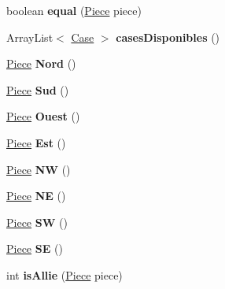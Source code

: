 \begin{DoxyCompactItemize}
\item 
boolean {\bfseries equal} (\hyperlink{class_piece}{Piece} piece)\hypertarget{class_piece_a7f9f2a3c7eda5a514b4170a354a85219}{}\label{class_piece_a7f9f2a3c7eda5a514b4170a354a85219}

\item 
Array\+List$<$ \hyperlink{class_case}{Case} $>$ {\bfseries cases\+Disponibles} ()\hypertarget{class_piece_a4023e5d15a349d33a4751de3715f8fd5}{}\label{class_piece_a4023e5d15a349d33a4751de3715f8fd5}

\item 
\hyperlink{class_piece}{Piece} {\bfseries Nord} ()\hypertarget{class_piece_a3632015f5d1331181681bb66ccd4bfb9}{}\label{class_piece_a3632015f5d1331181681bb66ccd4bfb9}

\item 
\hyperlink{class_piece}{Piece} {\bfseries Sud} ()\hypertarget{class_piece_a29bbc81f7f3590113cbc8bb0f5b93f28}{}\label{class_piece_a29bbc81f7f3590113cbc8bb0f5b93f28}

\item 
\hyperlink{class_piece}{Piece} {\bfseries Ouest} ()\hypertarget{class_piece_a214faa1a1483788ef65dc508f754be61}{}\label{class_piece_a214faa1a1483788ef65dc508f754be61}

\item 
\hyperlink{class_piece}{Piece} {\bfseries Est} ()\hypertarget{class_piece_ae70dd25fc57b4db1e2e5dee0f2771a25}{}\label{class_piece_ae70dd25fc57b4db1e2e5dee0f2771a25}

\item 
\hyperlink{class_piece}{Piece} {\bfseries NW} ()\hypertarget{class_piece_ae6ca403a299e7eac82168442dd652b28}{}\label{class_piece_ae6ca403a299e7eac82168442dd652b28}

\item 
\hyperlink{class_piece}{Piece} {\bfseries NE} ()\hypertarget{class_piece_af23d8d7f49b2da14f7c618b9966175f9}{}\label{class_piece_af23d8d7f49b2da14f7c618b9966175f9}

\item 
\hyperlink{class_piece}{Piece} {\bfseries SW} ()\hypertarget{class_piece_a6d1f8de619898cd2e29c394a4d8eecc0}{}\label{class_piece_a6d1f8de619898cd2e29c394a4d8eecc0}

\item 
\hyperlink{class_piece}{Piece} {\bfseries SE} ()\hypertarget{class_piece_af3553cdbbfa760fb29b5e83bbeb80d2c}{}\label{class_piece_af3553cdbbfa760fb29b5e83bbeb80d2c}

\item 
int {\bfseries is\+Allie} (\hyperlink{class_piece}{Piece} piece)\hypertarget{class_piece_aa6d5305cf852ce3aee36198e5f83e29a}{}\label{class_piece_aa6d5305cf852ce3aee36198e5f83e29a}

\end{DoxyCompactItemize}
